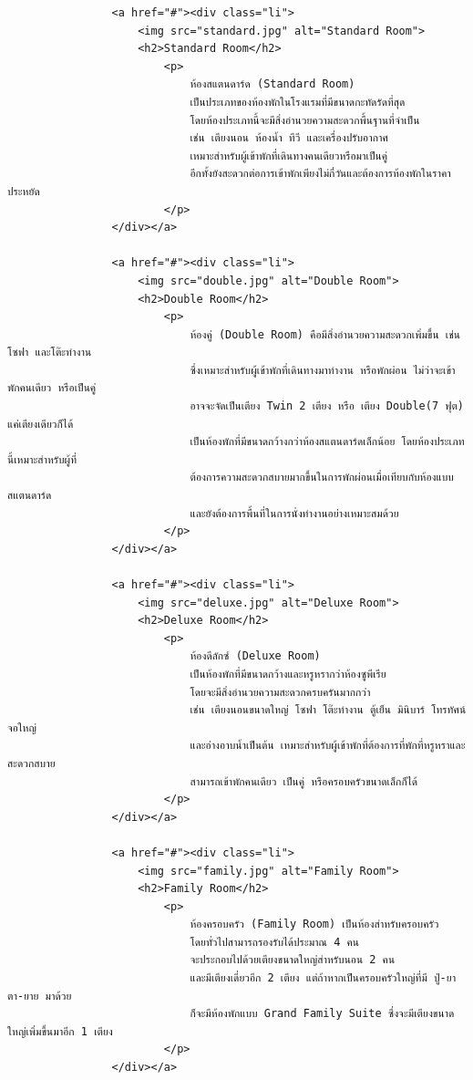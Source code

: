 \documentclass{report}
\begin{document}
\begin{verbatim}
                <a href="#"><div class="li">
                    <img src="standard.jpg" alt="Standard Room">
                    <h2>Standard Room</h2>
                        <p>
                            ห้องสแตนดาร์ด (Standard Room) 
                            เป็นประเภทของห้องพักในโรงแรมที่มีขนาดกะทัดรัดที่สุด 
                            โดยห้องประเภทนี้จะมีสิ่งอำนวยความสะดวกพื้นฐานที่จำเป็น 
                            เช่น เตียงนอน ห้องน้ำ ทีวี และเครื่องปรับอากาศ 
                            เหมาะสำหรับผู้เข้าพักที่เดินทางคนเดียวหรือมาเป็นคู่ 
                            อีกทั้งยังสะดวกต่อการเข้าพักเพียงไม่กี่วันและต้องการห้องพักในราคาประหยัด 
                        </p>
                </div></a>

                <a href="#"><div class="li">
                    <img src="double.jpg" alt="Double Room">     
                    <h2>Double Room</h2>
                        <p>
                            ห้องคู่ (Double Room) คือมีสิ่งอำนวยความสะดวกเพิ่มขึ้น เช่น โซฟา และโต๊ะทำงาน 
                            ซึ่งเหมาะสำหรับผู้เข้าพักที่เดินทางมาทำงาน หรือพักผ่อน ไม่ว่าจะเข้าพักคนเดียว หรือเป็นคู่ 
                            อาจจะจัดเป็นเตียง Twin 2 เตียง หรือ เตียง Double(7 ฟุต) แค่เตียงเดียวก็ได้
                            เป็นห้องพักที่มีขนาดกว้างกว่าห้องสแตนดาร์ดเล็กน้อย โดยห้องประเภทนี้เหมาะสำหรับผู้ที่
                            ต้องการความสะดวกสบายมากขึ้นในการพักผ่อนเมื่อเทียบกับห้องแบบสแตนดาร์ด 
                            และยังต้องการพื้นที่ในการนั่งทำงานอย่างเหมาะสมด้วย
                        </p>
                </div></a>

                <a href="#"><div class="li">
                    <img src="deluxe.jpg" alt="Deluxe Room">
                    <h2>Deluxe Room</h2>
                        <p>
                            ห้องดีลักซ์ (Deluxe Room) 
                            เป็นห้องพักที่มีขนาดกว้างและหรูหรากว่าห้องซูพีเรีย 
                            โดยจะมีสิ่งอำนวยความสะดวกครบครันมากกว่า 
                            เช่น เตียงนอนขนาดใหญ่ โซฟา โต๊ะทำงาน ตู้เย็น มินิบาร์ โทรทัศน์จอใหญ่ 
                            และอ่างอาบน้ำเป็นต้น เหมาะสำหรับผู้เข้าพักที่ต้องการที่พักที่หรูหราและสะดวกสบาย 
                            สามารถเข้าพักคนเดียว เป็นคู่ หรือครอบครัวขนาดเล็กก็ได้
                        </p>
                </div></a>

                <a href="#"><div class="li">
                    <img src="family.jpg" alt="Family Room">
                    <h2>Family Room</h2>
                        <p>
                            ห้องครอบครัว (Family Room) เป็นห้องสำหรับครอบครัว 
                            โดยทั่วไปสามารถรองรับได้ประมาณ 4 คน 
                            จะประกอบไปด้วยเตียงขนาดใหญ่สำหรับนอน 2 คน 
                            และมีเตียงเดี่ยวอีก 2 เตียง แต่ถ้าหากเป็นครอบครัวใหญ่ที่มี ปู่-ยา ตา-ยาย มาด้วย 
                            ก็จะมีห้องพักแบบ Grand Family Suite ซึ่งจะมีเตียงขนาดใหญ่เพิ่มขึ้นมาอีก 1 เตียง
                        </p>
                </div></a>


\end{verbatim}
\end{document}

